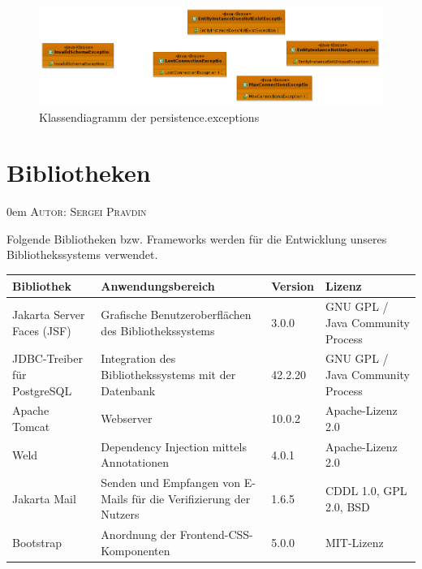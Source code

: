 \documentclass{article}
\makeatletter
\newcommand{\sectionauthor}[1]{
	{\parindent 0em \large \scshape Autor: #1 \par \nobreak \vspace*{1em}}
	\@afterheading
}
\makeatother
\begin{document}
\begin{figure}[H]
		\centering
		\includegraphics[width = 52em]{Klassendiagramm-ExceptionUnten}
		\caption{Klassendiagramm der persistence.exceptions}
\end{figure}
\restoregeometry
\newpage
\section{Bibliotheken}
\sectionauthor{Sergei Pravdin}

\newenvironment{controls}
{
    \begin{table}[H]
        \centering
        \begin{tabular}{ p{7em} p{19em} p{4em} p{12em} }
            \toprule
            \textbf{Bibliothek} & \textbf{Anwendungsbereich} & \textbf{Version} & \textbf{Lizenz}\\
            \midrule
        }
        {
            \bottomrule
        \end{tabular}
    \end{table}
}

Folgende Bibliotheken bzw. Frameworks werden für die Entwicklung unseres Bibliothekssystems verwendet.

\begin{controls}
    Jakarta Server Faces (JSF) & Grafische Benutzeroberflächen des Bibliothekssystems & 3.0.0 & GNU GPL / Java Community Process\\
    JDBC-Treiber für PostgreSQL & Integration des Bibliothekssystems mit der Datenbank & 42.2.20 & GNU GPL / Java Community Process\\
    Apache Tomcat & Webserver & 10.0.2 & Apache-Lizenz 2.0\\
    Weld & Dependency Injection mittels Annotationen & 4.0.1 & Apache-Lizenz 2.0\\
    Jakarta Mail & Senden und Empfangen von E-Mails für die Verifizierung der Nutzers & 1.6.5 & CDDL 1.0, GPL 2.0, BSD\\
    Bootstrap & Anordnung der Frontend-CSS-Komponenten & 5.0.0 & MIT-Lizenz\\
\end{controls}
\end{document}
